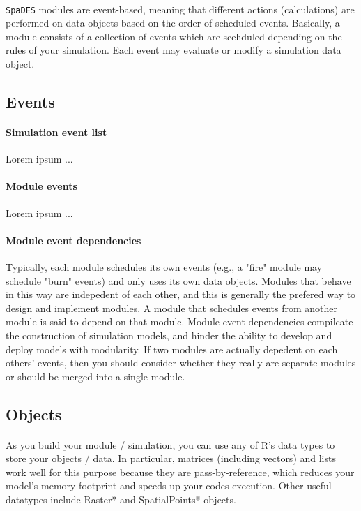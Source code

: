 \documentclass{article}
\begin{document}
\paragraph{}
\texttt{SpaDES} modules are event-based, meaning that different actions (calculations) are performed on data objects based on the order of scheduled events. Basically, a module consists of a collection of events which are scehduled depending on the rules of your simulation. Each event may evaluate or modify a simulation data object.

\subsection{Events}

\paragraph{Simulation event list}
Lorem ipsum ...

\paragraph{Module events}
Lorem ipsum ...

\paragraph{Module event dependencies}
Typically, each module schedules its own events (e.g., a "fire" module may schedule "burn" events) and only uses its own data objects. Modules that behave in this way are indepedent of each other, and this is generally the prefered way to design and implement modules. A module that schedules events from another module is said to depend on that module. Module event dependencies compilcate the construction of simulation models, and hinder the ability to develop and deploy models with modularity. If two modules are actually depedent on each others' events, then you should consider whether they really are separate modules or should be merged into a single module.

\subsection{Objects}

\paragraph{}
As you build your module / simulation, you can use any of \textsf{R}'s data types to store your objects / data. In particular, matrices (including vectors) and lists work well for this purpose because they are pass-by-reference, which reduces your model's memory footprint and speeds up your codes execution. Other useful datatypes include Raster* and SpatialPoints* objects.
\end{document}
